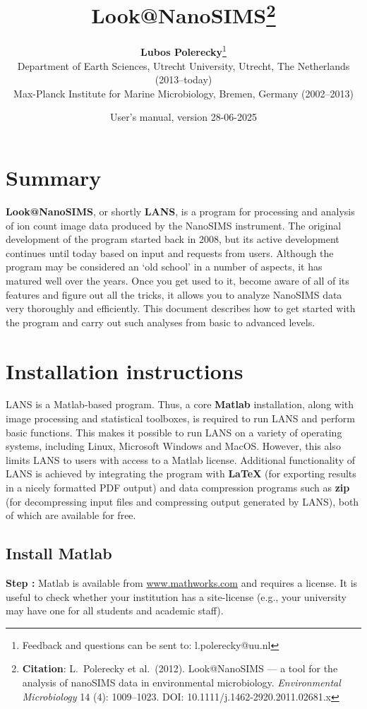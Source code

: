 \documentclass[a4paper, 11pt]{article}
\title{{\LARGE \bf Look@NanoSIMS}\footnote{\textbf{Citation}: L.~Polerecky et al.~(2012). Look@NanoSIMS --- a tool for the analysis of nanoSIMS data in environmental microbiology. \textit{Environmental Microbiology} 14 (4): 1009--1023. DOI: 10.1111/j.1462-2920.2011.02681.x}}
\author{{\large\bf Lubos Polerecky}\footnote{Feedback and questions can be sent to: l.polerecky@uu.nl}\\[6mm]
{\small Department of Earth Sciences, Utrecht University, Utrecht, The Netherlands (2013--today)} \\%
{\small Max-Planck Institute for Marine Microbiology, Bremen, Germany (2002--2013)}\\[3mm]}
\date{User's manual, version 28-06-2025}
\newcounter{step}
\newcommand\s{\addtocounter{step}{1}\vskip5pt\noindent\textbf{Step \thestep:}{ }}
\begin{document}
\maketitle
\reversemarginpar 


\section*{Summary}
\textbf{Look@NanoSIMS}, or shortly \textbf{LANS}, is a program for processing and analysis of ion count image data produced by the NanoSIMS instrument. The original development of the program started back in 2008, but its active development continues until today based on input and requests from users. Although the program may be considered an `old school' in a number of aspects, it has matured well over the years. Once you get used to it, become aware of all of its features and figure out all the tricks, it allows you to analyze NanoSIMS data very thoroughly and efficiently. This document describes how to get started with the program and carry out such analyses from basic to advanced levels. 


\tableofcontents

\section{Installation instructions}

LANS is a Matlab-based program. Thus, a core \textbf{Matlab} installation, along with image processing and statistical toolboxes, is required to run LANS and perform basic functions. This makes it possible to run LANS on a variety of operating systems, including Linux, Microsoft Windows and MacOS. However, this also limits LANS to users with access to a Matlab license. Additional functionality of LANS is achieved by integrating the program with \textbf{\LaTeX} (for exporting results in a nicely formatted PDF output) and data compression programs such as \textbf{zip} (for decompressing input files and compressing output generated by LANS), both of which are available for free.


\subsection{Install Matlab}
\setcounter{step}{0}

\s Matlab is available from \url{www.mathworks.com} and requires a license. It is useful to check whether your institution has a site-license (e.g., your university may have one for all students and academic staff). 
\end{document}
